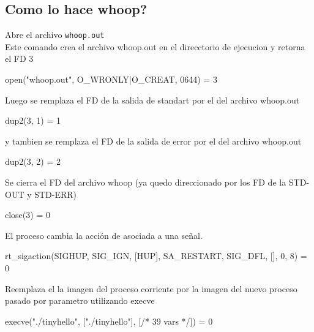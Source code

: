 \newpage

\subsection{Como lo hace whoop?}

Abre el archivo \verb|whoop.out|\\
Este comando crea el archivo whoop.out en el direcctorio de ejecucion y retorna el FD 3

\begin{framed}
\begin{verbatimtab}
open("whoop.out", O_WRONLY|O_CREAT, 0644) = 3
\end{verbatimtab}
\end{framed}

Luego se remplaza el FD de la salida de standart por el del archivo whoop.out

\begin{framed}
\begin{verbatimtab}
dup2(3, 1)                  = 1
\end{verbatimtab}
\end{framed}

y tambien se remplaza el FD de la salida de error por el del archivo whoop.out
\begin{framed}
\begin{verbatimtab}
dup2(3, 2)                  = 2
\end{verbatimtab}
\end{framed}

Se cierra el FD del archivo whoop (ya quedo direccionado por los FD de la STD-OUT y STD-ERR)
\begin{framed}
\begin{verbatimtab}
close(3)                    = 0
\end{verbatimtab}
\end{framed}

El proceso cambia la acci\'on de asociada a una se\~nal.
\begin{framed}
\begin{verbatimtab}
rt_sigaction(SIGHUP, {SIG_IGN, [HUP], SA_RESTART}, {SIG_DFL, [], 0}, 8) = 0
\end{verbatimtab}
\end{framed}

Reemplaza el la imagen del proceso corriente por la imagen del nuevo proceso pasado por parametro utilizando execve
\begin{framed}
\begin{verbatimtab}
execve("./tinyhello", ["./tinyhello"], [/* 39 vars */]) = 0
\end{verbatimtab}
\end{framed}

